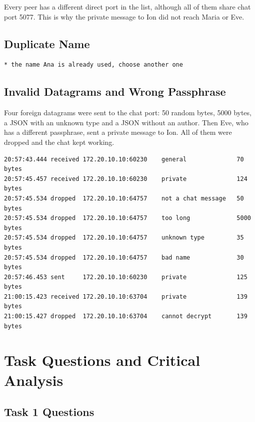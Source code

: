 \documentclass[11pt, a4paper]{article}
\begin{document}
Every peer has a different direct port in the list, although all of them share chat port 5077. This is why the private message to Ion did not reach Maria or Eve.

\subsection{Duplicate Name}

\begin{lstlisting}[style=terminal, caption={The second process named Ana}]
* the name Ana is already used, choose another one
\end{lstlisting}

\subsection{Invalid Datagrams and Wrong Passphrase}
Four foreign datagrams were sent to the chat port: 50 random bytes, 5000 bytes, a JSON with an unknown type and a JSON without an author. Then Eve, who has a different passphrase, sent a private message to Ion. All of them were dropped and the chat kept working.

\begin{lstlisting}[style=terminal, caption={Fragment of \texttt{chat-Ion.log}}]
20:57:43.444 received 172.20.10.10:60230    general              70 bytes
20:57:45.457 received 172.20.10.10:60230    private              124 bytes
20:57:45.534 dropped  172.20.10.10:64757    not a chat message   50 bytes
20:57:45.534 dropped  172.20.10.10:64757    too long             5000 bytes
20:57:45.534 dropped  172.20.10.10:64757    unknown type         35 bytes
20:57:45.534 dropped  172.20.10.10:64757    bad name             30 bytes
20:57:46.453 sent     172.20.10.10:60230    private              125 bytes
21:00:15.423 received 172.20.10.10:63704    private              139 bytes
21:00:15.427 dropped  172.20.10.10:63704    cannot decrypt       139 bytes
\end{lstlisting}

\section{Task Questions and Critical Analysis}

\subsection{Task 1 Questions}
\end{document}

